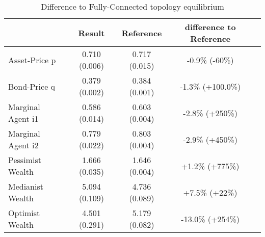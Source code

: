 \documentclass[Bachelorarbeit.tex]{subfiles}
\begin{document}
\begin{table}[H]
	\caption{Difference to Fully-Connected topology equilibrium}
	\centering
	\begin{tabular} { l c c c r }
		& Result & Reference & difference to Reference \\
		\hline
		Asset-Price p & 0.710 (0.006) & 0.717 (0.015) & -0.9\% (-60\%) \\
		Bond-Price q & 0.379 (0.002) & 0.384 (0.001) & -1.3\% (+100.0\%) \\
		Marginal Agent i1 & 0.586 (0.014) & 0.603 (0.004) & -2.8\% (+250\%) \\
		Marginal Agent i2 & 0.779 (0.022) & 0.803 (0.004) & -2.9\% (+450\%) \\
		\hline
		Pessimist Wealth & 1.666 (0.035) & 1.646 (0.004) & +1.2\% (+775\%) \\
		Medianist Wealth & 5.094 (0.109) & 4.736 (0.089) & +7.5\% (+22\%) \\
		Optimist Wealth & 4.501 (0.291) & 5.179 (0.082) & -13.0\% (+254\%) \\
		\hline
	\end{tabular}
\end{table}
\end{document}
